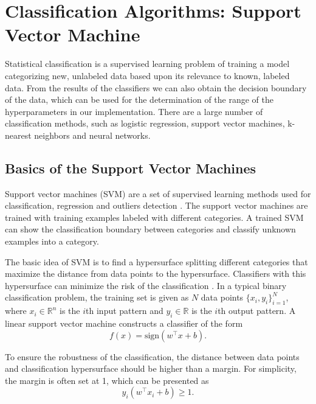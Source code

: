 \section{Classification Algorithms: Support Vector Machine}

Statistical classification is a supervised learning problem of training a model categorizing new, unlabeled data based upon its relevance to known, labeled data. From the results of the classifiers we can also obtain the decision boundary of the data, which can be used for the determination of the range of the hyperparameters in our implementation. There are a large number of classification methods, such as logistic regression, support vector machines, k-nearest neighbors and neural networks.

\subsection{Basics of the Support Vector Machines}

Support vector machines (SVM) are a set of supervised learning methods used for classification, regression and outliers detection \cite{suykens1999least}. The support vector machines are trained with training examples labeled with different categories. A trained SVM can show the classification boundary between categories and classify unknown examples into a category.

The basic idea of SVM is to find a hypersurface splitting different categories that maximize the distance from data points to the hypersurface. Classifiers with this hypersurface can minimize the risk of the classification \cite{vapnik1999overview}. In a typical binary classification problem, the training set is given as $N$ data points $\{x_{i},y_{i}\}^{N}_{i=1}$, where $x_{i} \in \mathbb{R}^n$ is the $i$th input pattern and $y_{i} \in \mathbb{R}$ is the $i$th output pattern. A linear support vector machine constructs a classifier of the form
\begin{equation}
f(x)=\mathrm{sign}( w^\top x +b).
\end{equation}

To ensure the robustness of the classification, the distance between data points and classification hypersurface should be higher than a margin. For simplicity, the margin is often set at 1, which can be presented as
\begin{equation}
y_{i}(w^\top x_{i}+b)\geqslant 1.
\end{equation}


